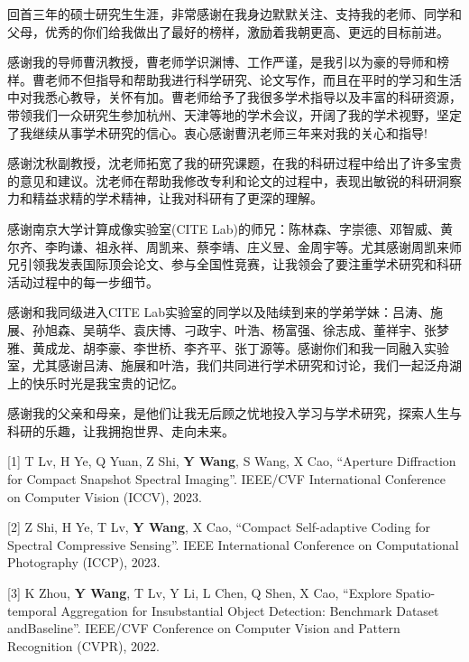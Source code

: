 \documentclass[
    type = master, %
    degree = academic,        %
    decl-page,  %
  ]{njuthesis}
\begin{document}
\begin{acknowledgement}

回首三年的硕士研究生生涯，非常感谢在我身边默默关注、支持我的老师、同学和父母，优秀的你们给我做出了最好的榜样，激励着我朝更高、更远的目标前进。  

感谢我的导师曹汛教授，曹老师学识渊博、工作严谨，是我引以为豪的导师和榜样。曹老师不但指导和帮助我进行科学研究、论文写作，而且在平时的学习和生活中对我悉心教导，关怀有加。曹老师给予了我很多学术指导以及丰富的科研资源，带领我们一众研究生参加杭州、天津等地的学术会议，开阔了我的学术视野，坚定了我继续从事学术研究的信心。衷心感谢曹汛老师三年来对我的关心和指导!

感谢沈秋副教授，沈老师拓宽了我的研究课题，在我的科研过程中给出了许多宝贵的意见和建议。沈老师在帮助我修改专利和论文的过程中，表现出敏锐的科研洞察力和精益求精的学术精神，让我对科研有了更深的理解。

感谢南京大学计算成像实验室(CITE Lab)的师兄：陈林森、字崇德、邓智威、黄尔齐、李昀谦、祖永祥、周凯来、蔡李靖、庄义昱、金周宇等。尤其感谢周凯来师兄引领我发表国际顶会论文、参与全国性竞赛，让我领会了要注重学术研究和科研活动过程中的每一步细节。

感谢和我同级进入CITE Lab实验室的同学以及陆续到来的学弟学妹：吕涛、施展、孙旭森、吴萌华、袁庆博、刁政宇、叶浩、杨富强、徐志成、董祥宇、张梦雅、黄成龙、胡李豪、李世桥、李齐平、张丁源等。感谢你们和我一同融入实验室，尤其感谢吕涛、施展和叶浩，我们共同进行学术研究和讨论，我们一起泛舟湖上的快乐时光是我宝贵的记忆。

感谢我的父亲和母亲，是他们让我无后顾之忧地投入学习与学术研究，探索人生与科研的乐趣，让我拥抱世界、走向未来。

\end{acknowledgement}


[1]	T Lv, H Ye, Q Yuan, Z Shi, \textbf{Y Wang}, S Wang, X Cao, “Aperture Diffraction for Compact Snapshot Spectral Imaging”. IEEE/CVF International Conference on Computer Vision (ICCV), 2023.

[2]	Z Shi, H Ye, T Lv, \textbf{Y Wang}, X Cao, “Compact Self-adaptive Coding for Spectral Compressive Sensing”. IEEE International Conference on Computational Photography (ICCP), 2023.

[3]	K Zhou, \textbf{Y Wang}, T Lv, Y Li, L Chen, Q Shen, X Cao, “Explore Spatio-temporal Aggregation for 
Insubstantial Object Detection: Benchmark Dataset andBaseline”. IEEE/CVF Conference on Computer Vision and Pattern Recognition (CVPR), 2022.
\end{document}
